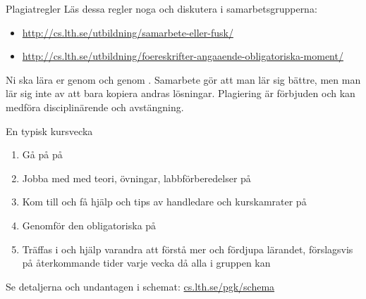 \begin{Slide}{Plagiatregler}
Läs dessa regler noga och diskutera i samarbetsgrupperna:
\begin{itemize}
\footnotesize
\item \url{http://cs.lth.se/utbildning/samarbete-eller-fusk/}
\item \url{http://cs.lth.se/utbildning/foereskrifter-angaaende-obligatoriska-moment/}
\end{itemize}
Ni ska lära er genom  och genom  . Samarbete gör att man lär sig bättre, men man lär sig inte av att bara kopiera andras lösningar. Plagiering är förbjuden och kan medföra disciplinärende och avstängning.
\end{Slide}

\fi %

\begin{Slide}{En typisk kursvecka}
\begin{enumerate}
\item Gå på  på 
\item Jobba med  med teori, övningar, labbförberedelser på  
\item Kom till  och få hjälp och tips av handledare och kurskamrater på 
\item Genomför den obligatoriska  på 
\item Träffas i  och hjälp varandra att förstå mer och fördjupa lärandet, förslagsvis på återkommande tider varje vecka då alla i gruppen kan
\end{enumerate}
Se detaljerna och undantagen i schemat: \href{http://cs.lth.se/pgk/schema}{cs.lth.se/pgk/schema}
\end{Slide}

